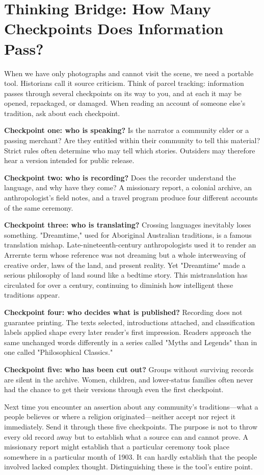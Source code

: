 \section[Thinking Bridge: Source Checkpoints]{Thinking Bridge: How Many Checkpoints Does Information Pass?}
When we have only photographs and cannot visit the scene, we need a portable tool. Historians call it source criticism. Think of parcel tracking: information passes through several checkpoints on its way to you, and at each it may be opened, repackaged, or damaged. When reading an account of someone else's tradition, ask about each checkpoint.

\textbf{Checkpoint one: who is speaking?} Is the narrator a community elder or a passing merchant? Are they entitled within their community to tell this material? Strict rules often determine who may tell which stories. Outsiders may therefore hear a version intended for public release.

\textbf{Checkpoint two: who is recording?} Does the recorder understand the language, and why have they come? A missionary report, a colonial archive, an anthropologist's field notes, and a travel program produce four different accounts of the same ceremony.

\textbf{Checkpoint three: who is translating?} Crossing languages inevitably loses something. "Dreamtime," used for Aboriginal Australian traditions, is a famous translation mishap. Late-nineteenth-century anthropologists used it to render an Arrernte term whose reference was not dreaming but a whole interweaving of creative order, laws of the land, and present reality. Yet "Dreamtime" made a serious philosophy of land sound like a bedtime story. This mistranslation has circulated for over a century, continuing to diminish how intelligent these traditions appear.

\textbf{Checkpoint four: who decides what is published?} Recording does not guarantee printing. The texts selected, introductions attached, and classification labels applied shape every later reader's first impression. Readers approach the same unchanged words differently in a series called "Myths and Legends" than in one called "Philosophical Classics."

\textbf{Checkpoint five: who has been cut out?} Groups without surviving records are silent in the archive. Women, children, and lower-status families often never had the chance to get their versions through even the first checkpoint.

Next time you encounter an assertion about any community's traditions---what a people believes or where a religion originated---neither accept nor reject it immediately. Send it through these five checkpoints. The purpose is not to throw every old record away but to establish what a source can and cannot prove. A missionary report might establish that a particular ceremony took place somewhere in a particular month of 1903. It can hardly establish that the people involved lacked complex thought. Distinguishing these is the tool's entire point.

